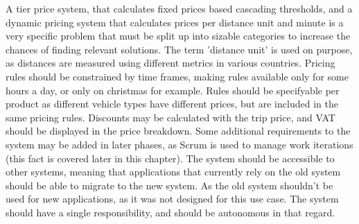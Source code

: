 A tier price system, that calculates fixed prices based cascading thresholds, and a dynamic pricing system that calculates prices per distance unit and minute is a very specific problem that must be split up into sizable categories to increase the chances of finding relevant solutions. The term 'distance unit' is used on purpose, as distances are measured using different metrics in various countries. Pricing rules should be constrained by time frames, making rules available only for some hours a day, or only on christmas for example. Rules should be specifyable per product as different vehicle types have different prices, but are included in the same pricing rules. Discounts may be calculated with the trip price, and VAT should be displayed in the price breakdown. Some additional requirements to the system may be added in later phases, as Scrum is used to manage work iterations (this fact is covered later in this chapter). The system should be accessible to other systems, meaning that applications that currently rely on the old system should be able to migrate to the new system. As the old system shouldn't be used for new applications, as it was not designed for this use case. The system should have a single responsibility, and should be autonomous in that regard.